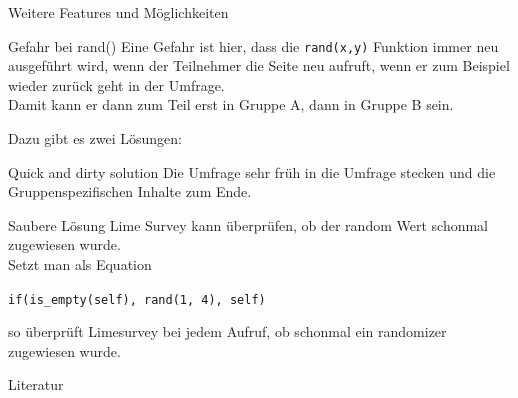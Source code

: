 \documentclass[aspectratio=1610, 9pt]{beamer}
\begin{document}
\begin{frame}
	{Weitere Features und Möglichkeiten}
	\begin{alertblock}{Gefahr bei rand()}
		Eine Gefahr ist hier, dass die \texttt{rand(x,y)} Funktion immer neu
		ausgeführt wird, wenn der Teilnehmer die Seite neu aufruft, wenn er zum
		Beispiel wieder zurück geht in der Umfrage.
		\\
		Damit kann er dann zum Teil erst in Gruppe A, dann in Gruppe B sein.
	\end{alertblock}
	\medskip
	Dazu gibt es zwei Lösungen:
	\begin{block}{Quick and dirty solution}
		Die Umfrage sehr früh in die Umfrage stecken und die Gruppenspezifischen
		Inhalte zum Ende.
	\end{block}
	\medskip
	\begin{block}{Saubere Lösung}
		Lime Survey kann überprüfen, ob der random Wert schonmal zugewiesen wurde.
		\\
		Setzt man als Equation
		\begin{center}
			\texttt{if(is\_empty(self), rand(1, 4), self)}
		\end{center}
		so überprüft Limesurvey bei jedem Aufruf, ob schonmal ein randomizer
		zugewiesen wurde.
	\end{block}
\end{frame}

\begin{frame}{Literatur}
	\printbibliography{}
\end{frame}
\end{document}

